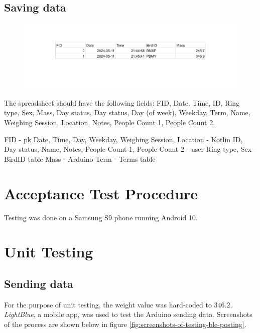 \documentclass[class=report,11pt,crop=false]{standalone}
\begin{document}
		
		
		\subsection{Saving data}
			
			
			\begin{figure}
				\centering
				\includegraphics[width=\linewidth]{Figures/exported_data}
				\caption{}
				\label{fig:exporteddata}
			\end{figure}
		
		The spreadsheet should have the following fields: FID, Date, Time, ID, Ring type, Sex, Mass, Day status, Day status, Day (of week), Weekday, Term, Name, Weighing Session, Location, Notes, People Count 1, People Count 2.
		
		FID - pk
		Date, Time, Day, Weekday, Weighing Session, Location - Kotlin
		ID, Day status, Name, Notes, People Count 1, People Count 2 - user
		Ring type, Sex - BirdID table
		Mass - Arduino
		Term - Terms table
		
	
	
	\section{Acceptance Test Procedure}
	Testing was done on a Samsung S9 phone running Android 10.
	\section{Unit Testing}
		
		\subsection{Sending data}
		For the purpose of unit testing, the weight value was hard-coded to $346.2$.
		\textit{LightBlue}, a mobile app, was used to test the Arduino sending data. Screenshots of the process are shown below in figure \ref{fig:screenshots-of-testing-ble-posting}.
		
\end{document}
